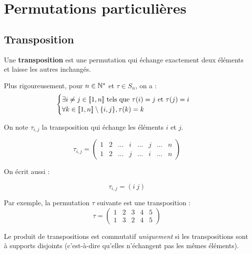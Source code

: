 \documentclass[12pt, a4paper]{report}
\begin{document}
\section{Permutations particulières}

\subsection{Transposition}

\begin{definition}[Transposition]
    Une \textbf{transposition} est une permutation qui échange exactement deux éléments et laisse les autres inchangés.

    Plus rigoureusement, pour $n \in \mathbb{N}^*$ et $\tau \in S_n$, on a :
    $$\begin{cases}
    \exists i \ne j \in [\![1,n]\!] \text{ tels que } \tau(i) = j \text{ et } \tau(j) = i \\
    \forall k \in [\![1,n]\!] \setminus \{i,j\}, \tau(k) = k
    \end{cases}$$

    On note $\tau_{i,j}$ la transposition qui échange les éléments $i$ et $j$.

    $$\tau_{i,j} = \left(\begin{matrix} 1 & 2 & \dots & i & \dots & j & \dots & n \\ 1 & 2 & \dots & j & \dots & i & \dots & n \end{matrix}\right)$$

    On écrit aussi :
    
    $$\tau_{i,j} = (i \ j)$$
\end{definition}

\begin{example}
    Par exemple, la permutation $\tau$ suivante est une transposition :
    $$
\tau = \left(\begin{matrix} 1 & 2 & 3 & 4 & 5 \\ 1 & 3 & 2 & 4 & 5 \end{matrix}\right)
    $$
\end{example}

\begin{property}
    Le produit de transpositions est commutatif \textit{uniquement} si les transpositions sont à supports disjoints (c'est-à-dire qu'elles n'échangent pas les mêmes éléments).
\end{property}
\end{document}
